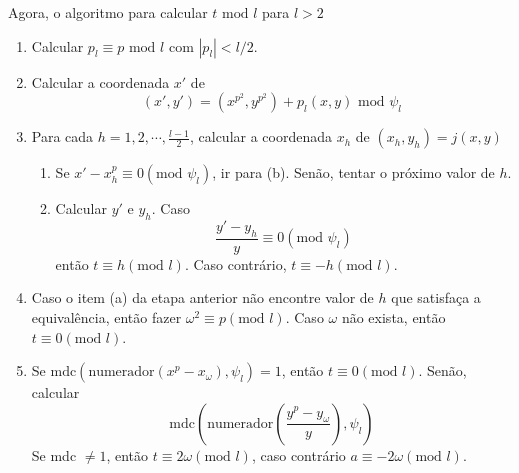 \begin{apendicesenv}
Agora, o algoritmo\cite{Mandy:2007} para calcular $t \mbox{ mod } l$ para $l > 2$
\begin{enumerate}
\item Calcular $p_l \equiv p\mbox{ mod } l$ com $|p_l| < l/2$.
\item Calcular a coordenada $x'$ de
$$(x',y') = (x^{p^2}, y^{p^2}) + p_l(x,y) \mbox{ mod } \psi_l$$
\item Para cada $h = 1,2,\cdots,\frac{l-1}{2}$, calcular a coordenada $x_h$ de $(x_h, y_h) = j(x,y)$
  \begin{enumerate}[label=(\alph*)]
  \item Se $x' - x_h^p \equiv 0 (\mbox{mod }\psi_l)$, ir para (b). Senão, tentar o próximo valor de $h$.
  \item Calcular $y'$ e $y_h$. Caso $$\frac{y'-y_h}{y} \equiv 0 (\mbox{mod }\psi_l)$$ então $t \equiv h (\mbox{mod }l)$. Caso contrário, $t \equiv -h (\mbox{mod }l)$.
  \end{enumerate}
\item Caso o item (a) da etapa anterior não encontre valor de $h$ que satisfaça a equivalência, então fazer $\omega^2 \equiv p (\mbox{mod }l)$. Caso $\omega$ não exista, então $t \equiv 0 (\mbox{mod }l)$.
\item Se $\mbox{mdc}(\mbox{numerador}(x^p - x_\omega), \psi_l) = 1$, então $t \equiv 0 (\mbox{mod }l)$. Senão, calcular $$\mbox{mdc}(\mbox{numerador}(\frac{y^p - y_\omega}{y}), \psi_l)$$
Se mdc $\neq 1$, então $t \equiv 2\omega (\mbox{mod }l)$, caso contrário $a \equiv -2\omega (\mbox{mod }l)$.
\end{enumerate}
\end{apendicesenv}
